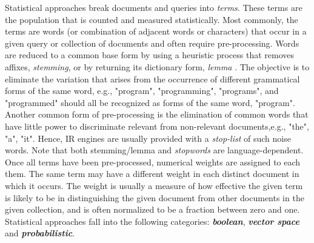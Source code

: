 Statistical approaches break documents and queries into \textit{terms}. These terms are the population that is counted and measured statistically. Most commonly, the terms are words (or combination of adjacent words or characters) that occur in a given query or collection of documents and often require pre-processing. Words are reduced to a common base form by using a heuristic process that removes affixes, \textit{stemming}, or by returning its dictionary form, \textit{lemma} \citep{porter1997}. The objective is to eliminate the variation that arises from the occurrence of different grammatical  forms  of  the  same  word,  e.g.,  "program",  "programming",  "programs", and "programmed" should all be recognized as forms of the same word, "program". Another common form of pre-processing is the elimination of common words that have little power to discriminate relevant from non-relevant documents,e.g., "the", "a", "it". Hence, IR engines are usually provided with a \textit{stop-list} of such noise words. Note that both stemming/lemma and \textit{stopwords} are language-dependent. Once all terms have been pre-processed, numerical weights are assigned to each them. The same term may have a different weight in each distinct document in which it occurs. The weight is usually a measure of how effective the given term is likely to be in distinguishing the given document from other documents in the given collection, and is often normalized to be a fraction between zero and one. Statistical approaches fall into the following categories: \textbf{\textit{boolean}}, \textbf{\textit{vector space}} and \textbf{\textit{probabilistic}}.

